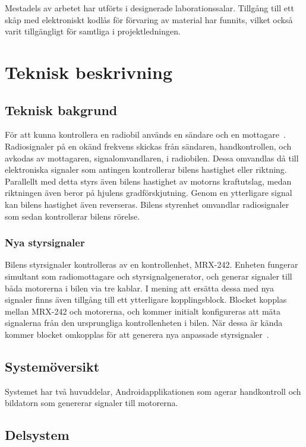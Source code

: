\documentclass[a4paper]{article}
\begin{document}
\vspace{5mm} \noindent
Mestadels av arbetet har utförts i designerade laborationssalar. Tillgång till ett skåp med elektroniskt kodlås för förvaring av material har funnits, vilket också varit tillgängligt för samtliga i projektledningen.

\section{Teknisk beskrivning}

\subsection{Teknisk bakgrund}
För att kunna kontrollera en radiobil används en sändare och en mottagare~\cite{RCTechnique}. Radiosignaler på en okänd frekvens skickas från sändaren, handkontrollen, och avkodas av mottagaren, signalomvandlaren, i radiobilen. Dessa omvandlas då till elektroniska signaler som antingen kontrollerar bilens hastighet eller riktning. Parallellt med detta styrs även bilens hastighet av motorns kraftutslag, medan riktningen även beror på hjulens gradförskjutning. Genom en ytterligare signal kan bilens hastighet även reverseras. Bilens styrenhet omvandlar radiosignaler som sedan kontrollerar bilens rörelse.

\subsubsection{Nya styrsignaler}
Bilens styrsignaler kontrolleras av en kontrollenhet, MRX-242. Enheten fungerar simultant som radiomottagare och styrsignalgenerator, och generar signaler till båda motorerna i bilen via tre kablar. I mening att ersätta dessa med nya signaler finns även tillgång till ett ytterligare kopplingsblock. Blocket kopplas mellan MRX-242 och motorerna, och kommer initialt konfigureras att mäta signalerna från den ursprungliga kontrollenheten i bilen. När dessa är kända kommer blocket omkopplas för att generera nya anpassade styrsignaler~\cite{projektDir}. 


\subsection{Systemöversikt}
Systemet har två huvuddelar, Androidapplikationen som agerar handkontroll och bildatorn som genererar signaler till motorerna.



\subsection{Delsystem}
\end{document}
